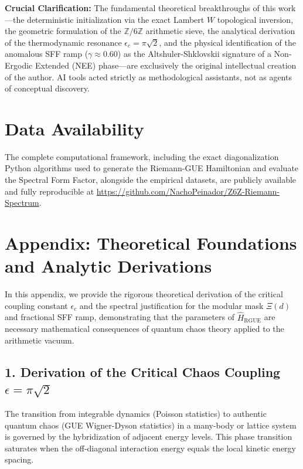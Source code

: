 \documentclass[aps,prl,preprint,superscriptaddress,floatfix]{revtex4-2}
\begin{document}
\begin{acknowledgments}
\textbf{Crucial Clarification:} The fundamental theoretical breakthroughs of this work—the deterministic initialization via the exact Lambert $W$ topological inversion, the geometric formulation of the $\mathbb{Z}/6\mathbb{Z}$ arithmetic sieve, the analytical derivation of the thermodynamic resonance $\epsilon_c = \pi\sqrt{2}$, and the physical identification of the anomalous SFF ramp ($\gamma \approx 0.60$) as the Altshuler-Shklovskii signature of a Non-Ergodic Extended (NEE) phase—are exclusively the original intellectual creation of the author. AI tools acted strictly as methodological assistants, not as agents of conceptual discovery.
\end{acknowledgments}

\section{Data Availability}
The complete computational framework, including the exact diagonalization Python algorithms used to generate the Riemann-GUE Hamiltonian and evaluate the Spectral Form Factor, alongside the empirical datasets, are publicly available and fully reproducible at \url{https://github.com/NachoPeinador/Z6Z-Riemann-Spectrum}.

\appendix

\section{Appendix: Theoretical Foundations and Analytic Derivations}
\label{app:theory}

In this appendix, we provide the rigorous theoretical derivation of the critical coupling constant $\epsilon_c$ and the spectral justification for the modular mask $\Xi(d)$ and fractional SFF ramp, demonstrating that the parameters of $\hat{H}_{\text{RGUE}}$ are necessary mathematical consequences of quantum chaos theory applied to the arithmetic vacuum.

\subsection{1. Derivation of the Critical Chaos Coupling \texorpdfstring{$\epsilon = \pi\sqrt{2}$}{epsilon}}
The transition from integrable dynamics (Poisson statistics) to authentic quantum chaos (GUE Wigner-Dyson statistics) in a many-body or lattice system is governed by the hybridization of adjacent energy levels. This phase transition saturates when the off-diagonal interaction energy equals the local kinetic energy spacing.
\end{document}
